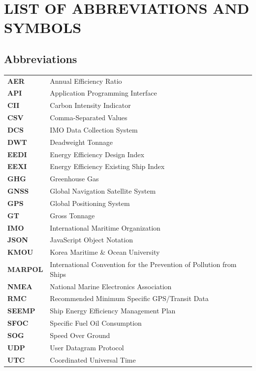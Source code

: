 \documentclass[12pt, a4paper]{report}
\begin{document}
\tableofcontents
\listoffigures
\listoftables

\clearpage

\section*{LIST OF ABBREVIATIONS AND SYMBOLS}

\subsection*{Abbreviations}
\begin{tabular}{ll}
\textbf{AER} & Annual Efficiency Ratio \\
\textbf{API} & Application Programming Interface \\
\textbf{CII} & Carbon Intensity Indicator \\
\textbf{CSV} & Comma-Separated Values \\
\textbf{DCS} & IMO Data Collection System \\
\textbf{DWT} & Deadweight Tonnage \\
\textbf{EEDI} & Energy Efficiency Design Index \\
\textbf{EEXI} & Energy Efficiency Existing Ship Index \\
\textbf{GHG} & Greenhouse Gas \\
\textbf{GNSS} & Global Navigation Satellite System \\
\textbf{GPS} & Global Positioning System \\
\textbf{GT} & Gross Tonnage \\
\textbf{IMO} & International Maritime Organization \\
\textbf{JSON} & JavaScript Object Notation \\
\textbf{KMOU} & Korea Maritime \& Ocean University \\
\textbf{MARPOL} & International Convention for the Prevention of Pollution from Ships \\
\textbf{NMEA} & National Marine Electronics Association \\
\textbf{RMC} & Recommended Minimum Specific GPS/Transit Data \\
\textbf{SEEMP} & Ship Energy Efficiency Management Plan \\
\textbf{SFOC} & Specific Fuel Oil Consumption \\
\textbf{SOG} & Speed Over Ground \\
\textbf{UDP} & User Datagram Protocol \\
\textbf{UTC} & Coordinated Universal Time \\
\end{tabular}
\end{document}
